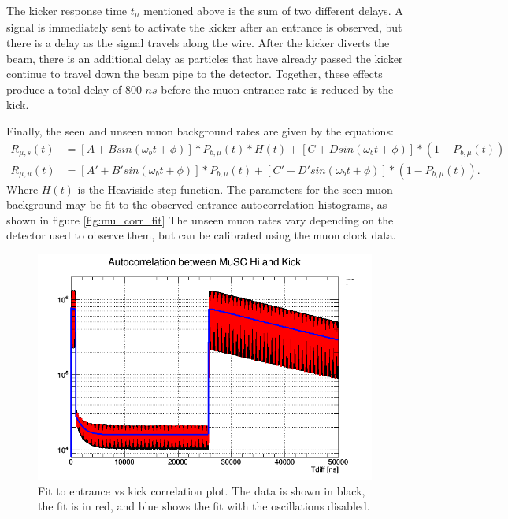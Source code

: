 The kicker response time $t_{\mu}$ mentioned above is the sum of two different delays.  
A signal is immediately sent to activate the kicker after an entrance is observed, but there is a delay as the signal travels along the wire.
After the kicker diverts the beam, there is an additional delay as particles that have already passed the kicker continue to travel down the beam pipe to the detector.
Together, these effects produce a total delay of 800 $ns$ before the muon entrance rate is reduced by the kick.

Finally, the seen and unseen muon background rates are given by the equations:
\begin{align}
R_{\mu,s}(t) & = [A + B sin(\omega_b t + \phi)] * P_{b,\mu}(t) * H(t) + [C + D sin(\omega_b t + \phi)] * (1-P_{b,\mu}(t)) \\
R_{\mu,u}(t) & = [A' + B' sin(\omega_b t + \phi)] * P_{b,\mu}(t) + [C' + D' sin(\omega_b t + \phi)] * (1-P_{b,\mu}(t)).
\label{eq:muon}
\end{align}
Where $H(t)$ is the Heaviside step function.
The parameters for the seen muon background may be fit to the observed entrance autocorrelation histograms, as shown in figure \ref{fig:mu_corr_fit}
The unseen muon rates vary depending on the detector used to observe them, but can be calibrated using the muon clock data.

\begin{figure}[h]
  \includegraphics[width=\textwidth]{beam/figures/MuSC_Kick_Corr.png}
  \caption{Fit to entrance vs kick correlation plot.  The data is shown in black, the fit is in red, and blue shows the fit with the oscillations disabled.}
  \label{fig:musc_fit}
\end{figure}

